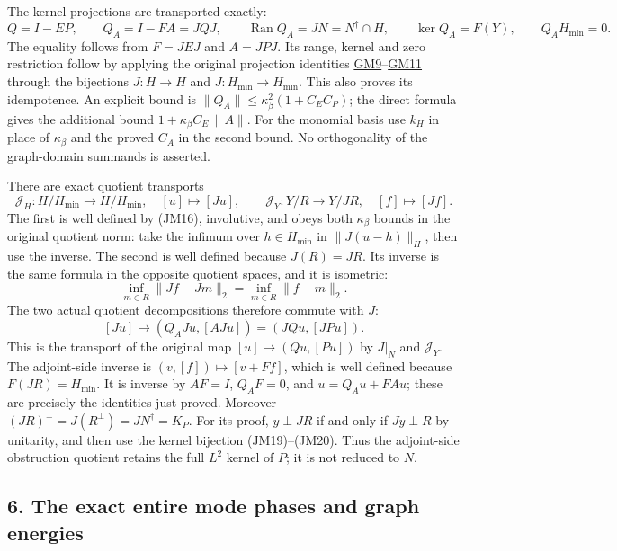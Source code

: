 \documentclass[
  11pt,
]{article}
\begin{document}
The kernel projections are transported exactly: \[
 Q=I-EP,\qquad Q_A=I-FA=JQJ,\qquad
 \operatorname{Ran}Q_A=JN=N^\dagger\cap H,\qquad
 \ker Q_A=F(Y),\qquad Q_AH_{\min}=0.
 \tag{JM25}
\]
The equality follows from \(F=JEJ\) and
\(A=JPJ\). Its range, kernel and zero restriction follow
by applying the original projection identities
\href{../u006-graph-domains/graph-domain-note.html\#eq-GM9}{GM9}--\href{../u006-graph-domains/graph-domain-note.html\#eq-GM11}{GM11}
through the bijections \(J:H\to H\) and
\(J:H_{\min}\to H_{\min}\). This also proves its idempotence. An explicit
bound is \(\|Q_A\|\leq\kappa_\beta^2(1+C_EC_P)\); the direct formula gives the
additional bound \(1+\kappa_\beta C_E\,\|A\|\). For the monomial basis use
\(k_H\) in place of \(\kappa_\beta\) and the
proved \(C_A\) in the second bound. No orthogonality of
the graph-domain summands is asserted.

There are exact quotient transports \[
 \mathcal J_H:H/H_{\min}\to H/H_{\min},\quad [u]\mapsto[Ju],
 \qquad
 \mathcal J_Y:Y/R\to Y/JR,\quad[f]\mapsto[Jf].
 \tag{JM26}
\] The first is
well defined by (JM16), involutive, and obeys both
\(\kappa_\beta\) bounds in the original quotient norm: take the
infimum over \(h\in H_{\min}\) in \(\|J(u-h)\|_H\), then
use the inverse. The second is well defined because
\(J(R)=JR\). Its inverse is the same formula in the opposite
quotient spaces, and it is isometric: \[
 \inf_{m\in R}\|Jf-Jm\|_2=\inf_{m\in R}\|f-m\|_2.
\] The two
actual quotient decompositions therefore commute with
\(J\): \[
 [Ju]\longmapsto(Q_AJu,[AJu])
       =(JQu,[JPu]).
\] This is the transport
of the original map \([u]\mapsto(Qu,[Pu])\) by \(J|_N\)
and \(\mathcal J_Y\). The adjoint-side inverse is
\((v,[f])\mapsto[v+Ff]\), which is well defined because
\(F(JR)=H_{\min}\). It is inverse by \(AF=I\),
\(Q_AF=0\), and \(u=Q_Au+FAu\); these are
precisely the identities just proved. Moreover \((JR)^\perp=J(R^\perp)=J N^\dagger=K_P\).
For its proof, \(y\perp JR\) if and only if
\(Jy\perp R\) by unitarity, and then use the kernel bijection
(JM19)--(JM20). Thus the adjoint-side obstruction quotient retains the
full \(L^2\) kernel of \(P\); it is
not reduced to \(N\).

\subsection{6. The exact entire mode phases and graph
energies}\label{the-exact-entire-mode-phases-and-graph-energies}
\end{document}
